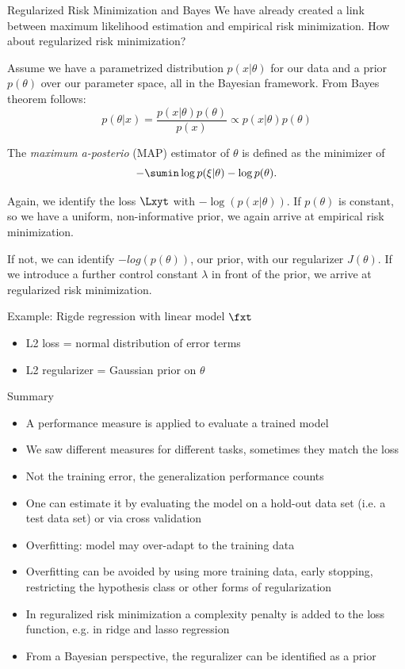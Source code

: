 \begin{vbframe}{Regularized Risk Minimization and Bayes}
We have already created a link between maximum likelihood estimation and empirical risk minimization. How about regularized risk minimization?

\lz

Assume we have a parametrized distribution $p(x | \theta)$ for our data and a prior $p(\theta)$ over our parameter space, all in the Bayesian framework.
From Bayes theorem follows:
$$
p(\theta | x) = \frac{p(x | \theta) p(\theta) }{p(x)} \propto p(x | \theta) p(\theta)
$$

\framebreak

The \emph{maximum a-posterio} (MAP)  estimator of $\theta$ is  defined as the minimizer of
\vspace{-0.2cm}
$$
- \sumin \log p(\xi | \theta) - \log p(\theta).
$$

Again, we identify the loss $\Lxyt$ with $-\log(p(x | \theta))$. If $p(\theta)$ is constant, so we have a uniform, non-informative prior, we again arrive at empirical risk minimization.

\lz

If not, we can identify $-log(p(\theta))$, our prior, with our regularizer $J(\theta)$.
If we introduce a further control constant $\lambda$ in front of the prior,
we arrive at regularized risk minimization.

\lz

Example: Rigde regression with linear model $\fxt$
\begin{itemize}
\item L2 loss = normal distribution of error terms
\item L2 regularizer = Gaussian prior on $\theta$
\end{itemize}

\end{vbframe}


\begin{frame}{Summary}
\begin{itemize}
\item A performance measure is applied to evaluate a trained model
\item We saw different measures for different tasks, sometimes they match the loss
\item Not the training error, the generalization performance counts
\item One can estimate it by evaluating the model on a hold-out data set (i.e. a test data set) or via cross validation
\item  Overfitting: model may over-adapt to the training data
\item Overfitting can be avoided by using more training data, early stopping, restricting the hypothesis class or other forms of regularization
\item In reguralized risk minimization a complexity penalty is added to the loss function, e.g. in ridge and lasso regression
\item From a Bayesian perspective, the reguralizer can be identified as a prior

\end{itemize}
\end{frame}


\endlecture
